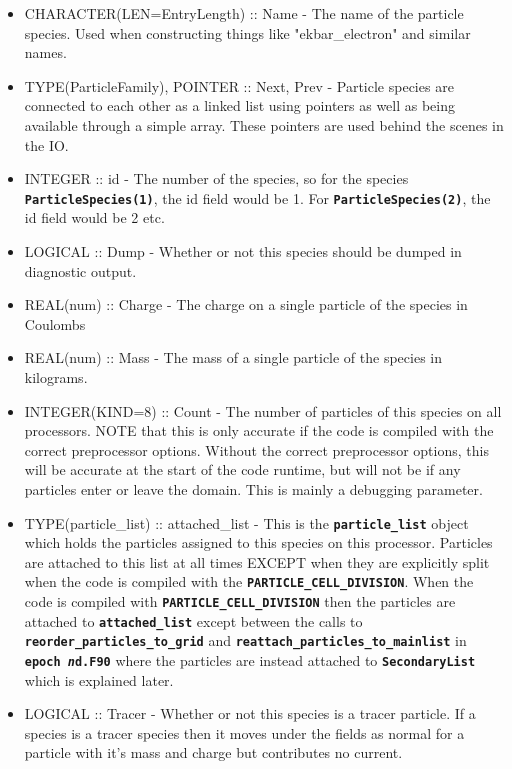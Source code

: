 \documentclass[12pt,a4paper]{article}
\newcommand{\inlinecode}[1]{{\color{warwickred} \bf\texttt{#1}}}
\begin{document}
\begin{itemize}
\item CHARACTER(LEN=EntryLength) :: Name - The name of the particle
  species. Used when constructing things like "ekbar\_electron" and similar
  names.
\item TYPE(ParticleFamily), POINTER :: Next, Prev - Particle species are
  connected to each other as a linked list using pointers as well as being
  available through a simple array. These pointers are used behind the scenes
  in the IO.
\item INTEGER :: id - The number of the species, so for the species
  \inlinecode{ParticleSpecies(1)}, the id field would be 1. For
  \inlinecode{ParticleSpecies(2)}, the id field would be 2 etc.
\item LOGICAL :: Dump - Whether or not this species should be dumped in
  diagnostic output.
\item REAL(num) :: Charge - The charge on a single particle of the species in
  Coulombs
\item REAL(num) :: Mass - The mass of a single particle of the species in
  kilograms.
\item INTEGER(KIND=8) :: Count - The number of particles of this species on
  all processors. NOTE that this is only accurate if the code is compiled with
  the correct preprocessor options. Without the correct preprocessor options,
  this will be accurate at the start of the code runtime, but will not be if
  any particles enter or leave the domain. This is mainly a debugging
  parameter.
\item TYPE(particle\_list) :: attached\_list - This is the
  \inlinecode{particle\_list} object which holds the particles assigned to this
  species on this processor. Particles are attached to this list at all times
  EXCEPT when they are explicitly split when the code is compiled with the
  \inlinecode{PARTICLE\_CELL\_DIVISION}. When the code is compiled with
  \inlinecode{PARTICLE\_CELL\_DIVISION} then the particles are attached to
  \inlinecode{attached\_list} except between the calls to
  \inlinecode{reorder\_particles\_to\_grid} and
  \inlinecode{reattach\_particles\_to\_mainlist} in \inlinecode{epoch{\it
      n}d.F90} where the particles are instead attached to
  \inlinecode{SecondaryList} which is explained later.
\item LOGICAL :: Tracer - Whether or not this species is a tracer particle. If
  a species is a tracer species then it moves under the fields as normal for a
  particle with it's mass and charge but contributes no current.

\end{itemize}
\end{document}
